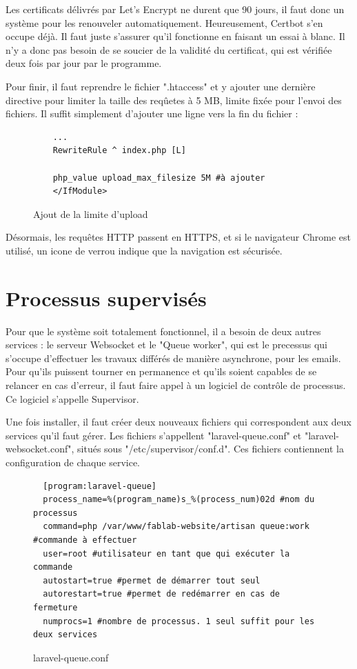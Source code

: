 \documentclass[
    iai, %
    eai, %
]{heig-tb}
\begin{document}
Les certificats délivrés par Let's Encrypt ne durent que 90 jours, il faut donc un système pour les renouveler automatiquement. Heureusement, Certbot s'en occupe déjà. Il faut juste s'assurer qu'il fonctionne en faisant un essai à blanc. Il n'y a donc pas besoin de se soucier de la validité du certificat, qui est vérifiée deux fois par jour par le programme.

Pour finir, il faut reprendre le fichier ".htaccess" et y ajouter une dernière directive pour limiter la taille des reqûetes à 5 MB, limite fixée pour l'envoi des fichiers. Il suffit simplement d'ajouter une ligne vers la fin du fichier :

\begin{figure}[h]
  \begin{verbatim}
    ...
    RewriteRule ^ index.php [L]

    php_value upload_max_filesize 5M #à ajouter
    </IfModule>
  \end{verbatim}
  \caption{Ajout de la limite d'upload}
\end{figure}

Désormais, les requêtes HTTP passent en HTTPS, et si le navigateur Chrome est utilisé, un icone de verrou indique que la navigation est sécurisée.

\newpage
\section{Processus supervisés}
Pour que le système soit totalement fonctionnel, il a besoin de deux autres services : le serveur Websocket et le "Queue worker", qui est le precessus qui s'occupe d'effectuer les travaux différés de manière asynchrone, pour les emails. Pour qu'ils puissent tourner en permanence et qu'ils soient capables de se relancer en cas d'erreur, il faut faire appel à un logiciel de contrôle de processus.
Ce logiciel s'appelle Supervisor.

Une fois installer, il faut créer deux nouveaux fichiers qui correspondent aux deux services qu'il faut gérer. Les fichiers s'appellent "laravel-queue.conf" et "laravel-websocket.conf", situés sous "/etc/supervisor/conf.d". Ces fichiers contiennent la configuration de chaque service.

\begin{figure}[h]
  \begin{verbatim}
  [program:laravel-queue]
  process_name=%(program_name)s_%(process_num)02d #nom du processus
  command=php /var/www/fablab-website/artisan queue:work #commande à effectuer
  user=root #utilisateur en tant que qui exécuter la commande
  autostart=true #permet de démarrer tout seul
  autorestart=true #permet de redémarrer en cas de fermeture
  numprocs=1 #nombre de processus. 1 seul suffit pour les deux services
  \end{verbatim}
  \caption{laravel-queue.conf}
\end{figure}
\end{document}
